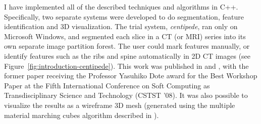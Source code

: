 I have implemented all of the described techniques and algorithms in C++. Specifically, two separate systems were developed to do segmentation, feature identification and 3D visualization. The trial system, \emph{centipede}, ran only on Microsoft Windows, and segmented each slice in a CT (or MRI) series into its own separate image partition forest. The user could mark features manually, or identify features such as the ribs and spine automatically in 2D CT images (see Figure~\ref{fig:introduction-centipede}). This work was published in \cite{gvccimi08} and \cite{gvcispa09}, with the former paper receiving the Professor Yasuhiko Dote award for the Best Workshop Paper at the Fifth International Conference on Soft Computing as Transdisciplinary Science and Technology (CSTST '08). It was also possible to visualize the results as a wireframe 3D mesh (generated using the multiple material marching cubes algorithm described in \cite{wu03}).


